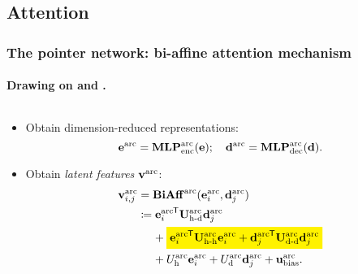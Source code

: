 \documentclass[8pt]{beamer}
\theoremstyle{definition}
\theoremstyle{plain}
\theoremstyle{definition}
\theoremstyle{remark}
\numberwithin{equation}{section}
\numberwithin{figure}{section}
\numberwithin{table}{section}
\newcommand{\mathcolorbox}[2]{\colorbox{#1}{$\displaystyle #2$}}
\newcommand*{\tran}{^{\mkern-1.5mu\mathsf{T}}}
\begin{document}
\subsection{Attention}
\begin{frame}
    \frametitle{The pointer network: bi-affine attention mechanism}
    \framesubtitle{Drawing on \textcite{dozat2016deep} and \textcite{vinyals2015pointer}.}
    \begin{columns}[t,onlytextwidth]
        \begin{column}[t]{0.52\textwidth}
            \begin{itemize}
            \item Obtain dimension-reduced representations:
            \[
                \vb{e}^{\text{arc}} = \mathbf{MLP}_{\text{enc}}^{\text{arc}}(\vb{e}); \quad \vb{d}^{\text{arc}} = \mathbf{MLP}_{\text{dec}}^{\text{arc}}(\vb{d}).
            \]

            \item Obtain \textit{latent features} \(\vb{v}^{\text{arc}}\):
            \begin{align*}
                \vb{v}^{\text{arc}}_{i,j} &= \mathbf{BiAff}^{\text{arc}}(\vb{e}^{\text{arc}}_{i}, \vb{d}^{\text{arc}}_{j}) \\
                &\coloneqq {\vb{e}^{\text{arc}}_{i}}\tran \mathbf{U}_{\text{h-d}}^{\text{arc}} \vb{d}_{j}^{\text{arc}} \\
                    &\phantom{\coloneqq}\   + \mathcolorbox{yellow}{
                        {\vb{e}_{i}^{\text{arc}}}\tran \mathbf{U}_{\text{h-h}}^{\text{arc}} \vb{e}_{i}^{\text{arc}}
                        + {\vb{d}_{j}^{\text{arc}}}\tran \mathbf{U}_{\text{d-d}}^{\text{arc}} \vb{d}_{j}^{\text{arc}}
                    } \\
                    &\phantom{\coloneqq}\  + U_{\text{h}}^{\text{arc}} \vb{e}_{i}^{\text{arc}}
                    + U_{\text{d}}^{\text{arc}} \vb{d}_{j}^{\text{arc}}
                    + \vb{u}_{\text{bias}}^{\text{arc}}.
            \end{align*}


\end{itemize}
\end{column}
\end{columns}
\end{frame}
\end{document}
